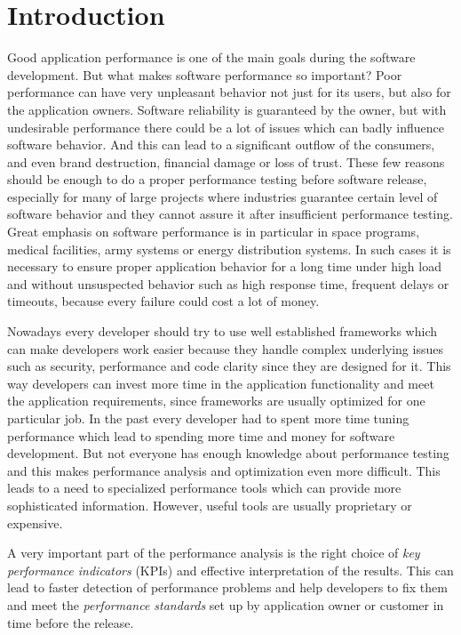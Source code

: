 

\chapter{Introduction}
\label{Introduction}
Good application performance is one of the main goals during the software development. But what makes software performance so important? Poor performance can have very unpleasant behavior not just for its users, but also for the application owners. Software reliability is guaranteed by the owner, but with undesirable performance there could be a lot of issues which can badly influence software behavior. And this can lead to a significant outflow of the consumers, and even brand destruction, financial damage or loss of trust. These few reasons should be enough to do a proper performance testing before software release, especially for many of large projects where industries guarantee certain level of software behavior and they cannot assure it after insufficient performance testing. Great emphasis on software performance is in particular in space programs, medical facilities, army systems or energy distribution systems. In such cases it is necessary to ensure proper application behavior for a long time under high load and without unsuspected behavior such as high response time, frequent delays or timeouts, because every failure could cost a lot of money. 

Nowadays every developer should try to use well established frameworks which can make developers work easier because they handle complex underlying issues such as security, performance and code clarity since they are designed for it. This way developers can invest more time in the application functionality and meet the application requirements, since frameworks are usually optimized for one particular job. In the past every developer had to spent more time tuning performance which lead to spending more time and money for software development. But not everyone has enough knowledge about performance testing and this makes performance analysis and optimization even more difficult. This leads to a need to specialized performance tools which can provide more sophisticated information. However, useful tools are usually proprietary or expensive.

A very important part of the performance analysis is the right choice of \emph{key performance indicators} (KPIs) \cite{Molyneaux:TAoAPT} and effective interpretation of the results. This can lead to faster detection of performance problems and help developers to fix them and meet the \emph{performance standards} \cite{Molyneaux:TAoAPT} set up by application owner or customer in time before the release. 

